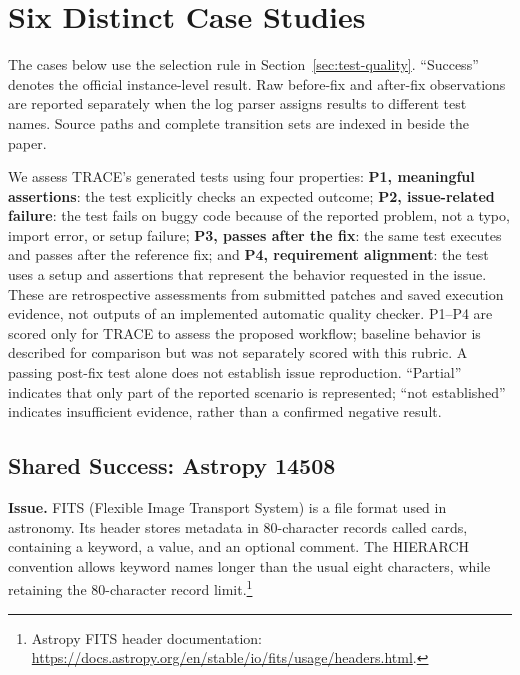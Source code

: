 \section{Six Distinct Case Studies}\label{app:cases}
The cases below use the selection rule in Section~\ref{sec:test-quality}. ``Success'' denotes the official instance-level result. Raw before-fix and after-fix observations are reported separately when the log parser assigns results to different test names. Source paths and complete transition sets are indexed in  beside the paper.

We assess TRACE's generated tests using four properties: \textbf{P1, meaningful assertions}: the test explicitly checks an expected outcome; \textbf{P2, issue-related failure}: the test fails on buggy code because of the reported problem, not a typo, import error, or setup failure; \textbf{P3, passes after the fix}: the same test executes and passes after the reference fix; and \textbf{P4, requirement alignment}: the test uses a setup and assertions that represent the behavior requested in the issue. These are retrospective assessments from submitted patches and saved execution evidence, not outputs of an implemented automatic quality checker. P1--P4 are scored only for TRACE to assess the proposed workflow; baseline behavior is described for comparison but was not separately scored with this rubric. A passing post-fix test alone does not establish issue reproduction. ``Partial'' indicates that only part of the reported scenario is represented; ``not established'' indicates insufficient evidence, rather than a confirmed negative result.

\subsection{Shared Success: Astropy 14508}
\textbf{Issue.} FITS (Flexible Image Transport System) is a file format used in astronomy. Its header stores metadata in 80-character records called cards, containing a keyword, a value, and an optional comment. The HIERARCH convention allows keyword names longer than the usual eight characters, while retaining the 80-character record limit.\footnote{Astropy FITS header documentation: \url{https://docs.astropy.org/en/stable/io/fits/usage/headers.html}.}

